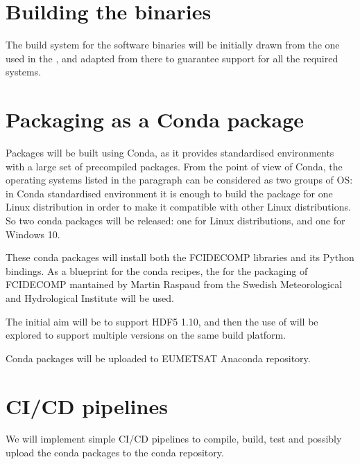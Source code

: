 \documentclass[a4paper,10pt,english]{sphinxmanual}
\begin{document}
\section{Building the binaries}
\label{\detokenize{packaging_strategy:building-the-binaries}}
\sphinxAtStartPar
The build system for the software binaries will be initially drawn from the one used in the
{\hyperref[\detokenize{introduction:fcidecomp-latest}]{}}, and adapted from there to guarantee support for all the
required systems.


\section{Packaging as a Conda package}
\label{\detokenize{packaging_strategy:packaging-as-a-conda-package}}
\sphinxAtStartPar
Packages will be built using Conda, as it provides standardised environments with a large set of pre\sphinxhyphen{}compiled packages.
From the point of view of Conda, the operating systems listed in the {\hyperref[\detokenize{packaging_strategy:supported-platforms}]{}}
paragraph can be considered as two groups of OS: in Conda standardised environment it is enough to build the package for
one Linux distribution in order to make it compatible with other Linux distributions. So two conda packages will be
released: one for Linux distributions, and one for Windows 10.

\sphinxAtStartPar
These conda packages will install both the FCIDECOMP libraries and its Python bindings. As a blueprint for the
conda recipes, the {\hyperref[\detokenize{introduction:fcidecomp-conda}]{}} for the packaging of FCIDECOMP mantained by Martin Raspaud
from the Swedish Meteorological and Hydrological Institute will be used.

\sphinxAtStartPar
The initial aim will be to support HDF5 1.10, and then the use of {\hyperref[\detokenize{introduction:conda-variants}]{}} will be
explored to support multiple versions on the same build platform.

\sphinxAtStartPar
Conda packages will be uploaded to EUMETSAT Anaconda repository.


\section{CI/CD pipelines}
\label{\detokenize{packaging_strategy:ci-cd-pipelines}}
\sphinxAtStartPar
We will implement simple CI/CD pipelines to compile, build, test and possibly upload the conda packages to the conda
repository.
\end{document}
